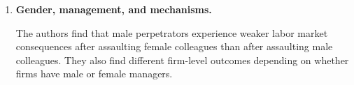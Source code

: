 \documentclass[12pt]{article}
\begin{document}
\begin{enumerate}
\begin{enumerate}

\item Calculate the difference-in-differences
estimate of the effect of a recorded workplace
violence incident on the female employment share.
Interpret its units.

%
\vspace{4cm}

\item Let $Y_{ft}$ denote the female employment
share in firm $f$ at time $t$.
Write a difference-in-differences regression
with firm fixed effects, time fixed effects,
and a treatment-by-post interaction.

Which coefficient captures the causal
effect of the incident?

%
\vspace{4cm}

\item State the identifying assumption.
Give one plausible example of how it could
be violated in this setting.

%
\vspace{4cm}

\end{enumerate}

\vspace{1cm}

\item \textbf{Gender, management, and mechanisms.}

The authors find that male perpetrators experience
weaker labor market consequences after assaulting
female colleagues than after assaulting male colleagues.
They also find different firm-level outcomes depending
on whether firms have male or female managers.


\end{enumerate}
\end{document}
